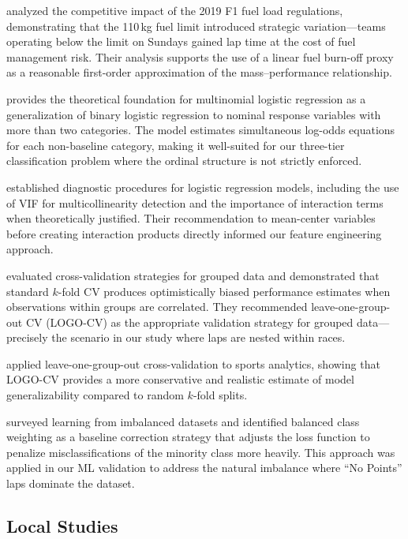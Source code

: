 \textcite{oldknow2022fuel} analyzed the competitive impact of the 2019 F1 fuel
load regulations, demonstrating that the 110\,kg fuel limit introduced
strategic variation---teams operating below the limit on Sundays gained lap
time at the cost of fuel management risk. Their analysis supports the use of a
linear fuel burn-off proxy as a reasonable first-order approximation of the
mass--performance relationship.

\textcite{agresti2013} provides the theoretical foundation for multinomial
logistic regression as a generalization of binary logistic regression to
nominal response variables with more than two categories. The model estimates
simultaneous log-odds equations for each non-baseline category, making it
well-suited for our three-tier classification problem where the ordinal
structure is not strictly enforced.

\textcite{hosmer2013} established diagnostic procedures for logistic
regression models, including the use of VIF for multicollinearity detection
and the importance of interaction terms when theoretically justified. Their
recommendation to mean-center variables before creating interaction products
directly informed our feature engineering approach.

\textcite{varoquaux2019} evaluated cross-validation strategies for grouped
data and demonstrated that standard $k$-fold CV produces optimistically biased
performance estimates when observations within groups are correlated. They
recommended leave-one-group-out CV (LOGO-CV) as the appropriate validation
strategy for grouped data---precisely the scenario in our study where laps are
nested within races.

\textcite{wong2023} applied leave-one-group-out cross-validation to sports
analytics, showing that LOGO-CV provides a more conservative and realistic
estimate of model generalizability compared to random $k$-fold splits.

\textcite{he2009learning} surveyed learning from imbalanced datasets and
identified balanced class weighting as a baseline correction strategy that
adjusts the loss function to penalize misclassifications of the minority class
more heavily. This approach was applied in our ML validation to address the
natural imbalance where ``No Points'' laps dominate the dataset.

\subsection{Local Studies}

